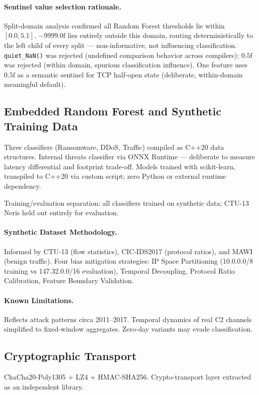 \documentclass[11pt,a4paper]{article}
\begin{document}
    \paragraph{Sentinel value selection rationale.}
    Split-domain analysis confirmed all Random Forest thresholds lie within $[0.0, 5.1]$.
    $-9999.0\text{f}$ lies entirely outside this domain, routing deterministically to the left
    child of every split --- non-informative, not influencing classification.
    \texttt{quiet\_NaN()} was rejected (undefined comparison behavior across compilers);
    $0.5\text{f}$ was rejected (within domain, spurious classification influence). One feature
    uses $0.5\text{f}$ as a semantic sentinel for TCP half-open state (deliberate,
    within-domain meaningful default).

    \subsection{Embedded Random Forest and Synthetic Training Data}

    Three classifiers (Ransomware, DDoS, Traffic) compiled as C++20 data structures. Internal
    threats classifier via ONNX Runtime --- deliberate to measure latency differential and
    footprint trade-off. Models trained with scikit-learn, transpiled to C++20 via custom script;
    zero Python or external runtime dependency.

    Training/evaluation separation: all classifiers trained on synthetic data; CTU-13 Neris held
    out entirely for evaluation.

    \paragraph{Synthetic Dataset Methodology.}
    Informed by CTU-13 (flow statistics), CIC-IDS2017 (protocol ratios), and MAWI (benign
    traffic). Four bias mitigation strategies: IP Space Partitioning (10.0.0.0/8 training vs
    147.32.0.0/16 evaluation), Temporal Decoupling, Protocol Ratio Calibration, Feature Boundary
    Validation.

    \paragraph{Known Limitations.}
    Reflects attack patterns circa 2011--2017. Temporal dynamics of real C2 channels simplified
    to fixed-window aggregates. Zero-day variants may evade classification.

    \subsection{Cryptographic Transport}
    ChaCha20-Poly1305 + LZ4 + HMAC-SHA256. Crypto-transport layer extracted as an independent
    library.
\end{document}
